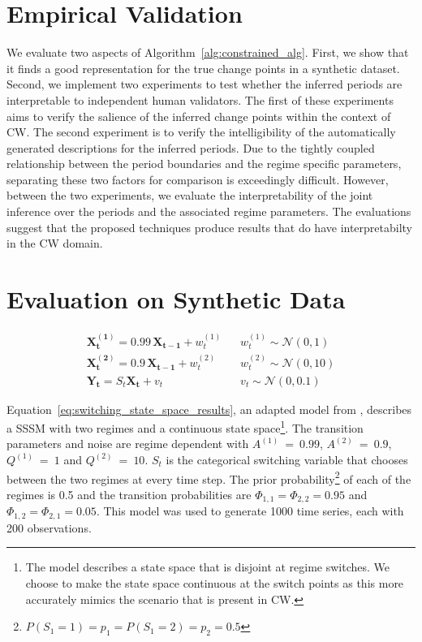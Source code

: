 \section{Empirical Validation}\label{sec:user_evaluation}
We evaluate two aspects of Algorithm~\ref{alg:constrained_alg}. First, we show that it finds a good representation for the true change points in a synthetic dataset. Second, we implement two experiments to test whether the inferred periods are interpretable to independent human validators. The first of these experiments aims to verify the salience of the inferred change points within the context of CW. The second experiment is to verify the intelligibility of the automatically generated descriptions for the inferred periods. Due to the tightly coupled relationship between the period boundaries and the regime specific parameters, separating these two factors for comparison is exceedingly difficult. However, between the two experiments, we evaluate the interpretability of the joint inference over the periods and the associated regime parameters. The evaluations suggest that the proposed techniques produce results that do have interpretabilty in the CW domain.

\section{Evaluation on Synthetic Data}

\begin{equation}
  \begin{split}
      \mathbf{X^{(1)}_t} = 0.99 \,\mathbf{X_{t-1}} + w^{(1)}_t \hspace{10pt} & w^{(1)}_t \sim \mathcal{N}(0,1) \\
      \mathbf{X^{(2)}_t} = 0.9 \,\mathbf{X_{t-1}} + w^{(2)}_t \hspace{10pt} & w^{(2)}_t \sim \mathcal{N}(0,10) \\
      \mathbf{Y_t} = S_t\mathbf{X_t} + v_t \hspace{10pt} & v_t \sim \mathcal{N}(0,0.1)
  \end{split}\label{eq:switching_state_space_results}
\end{equation}

Equation~\ref{eq:switching_state_space_results}, an adapted model from \citet{ghahramani2000variational}, describes a SSSM with two regimes and a continuous state space\footnote{The \citet{ghahramani2000variational} model describes a state space that is disjoint at regime switches. We choose to make the state space continuous at the switch points as this more accurately mimics the scenario that is present in CW.}. The transition parameters and noise are regime dependent with $A^{(1)}~=~0.99$, $A^{(2)}~=~0.9$, $Q^{(1)}~=~1$ and $Q^{(2)}~=~10$. $S_t$ is the categorical switching variable that chooses between the two regimes at every time step. The prior probability\footnote{$P(S_1=1)=p_1=P(S_1=2)=p_2=0.5$} of each of the regimes is 0.5 and the transition probabilities are $\Phi_{1,1} = \Phi_{2,2} = 0.95$ and $\Phi_{1,2} = \Phi_{2,1} = 0.05$. This model was used to generate 1000 time series, each with 200 observations.

